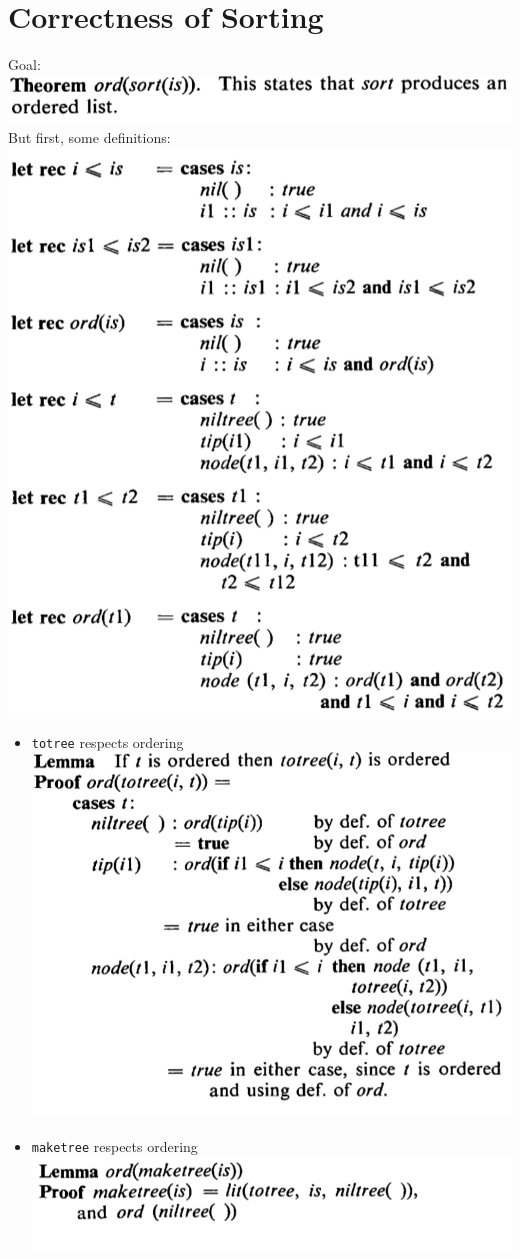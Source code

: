 \documentclass{beamer}
\newcommand{\code}[1]{\texttt{#1}}
\begin{document}
\section{Correctness of Sorting}
\begin{frame}
  Goal:
  {\center\includegraphics[width=.5\textwidth]{./sort-theorem.png}\\}
  \pause
  But first, some definitions:\\

  {\center\includegraphics[width=.5\textwidth]{./orderings.png}\\}
\end{frame}
\begin{frame}
  \begin{itemize}
  \item \code{totree} respects ordering\\
    {\center\includegraphics[width=.5\textwidth]{./ord-totree.png}\\}
  \item \code{maketree} respects ordering\\
    {\center\includegraphics[width=.5\textwidth]{./ord-maketree.png}\\}
  \end{itemize}
\end{frame}
\end{document}
